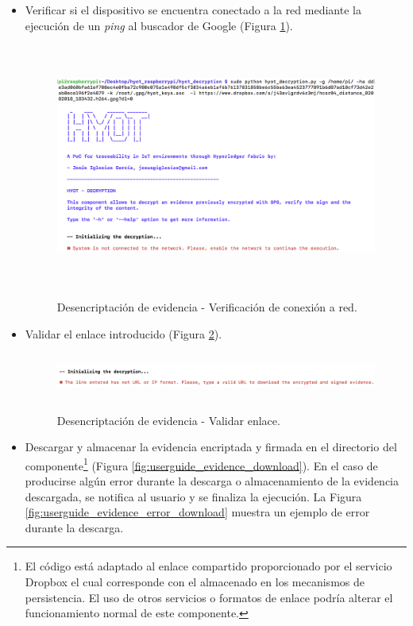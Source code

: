 \documentclass[12pt,a4paper, twoside]{report}
\begin{document}
	\begin{itemize}
		\item Verificar si el dispositivo se encuentra conectado a la red mediante la ejecución de un \textit{ping} al buscador de Google (Figura \ref{fig:userguide_evidence_ping}).
		
			\begin{figure}[!ht]   
				\caption{Desencriptación de evidencia - Verificación de conexión a red.} 
				\begin{center} 
					\includegraphics[width=14cm,height=8cm]{Images/userGuide/evidence/network} \\
					\label{fig:userguide_evidence_ping} 
				\end{center}  
			\end{figure}
		
		\newpage
		
		\item Validar el enlace introducido (Figura \ref{fig:userguide_evidence_link}).
		
			\begin{figure}[!ht]   
				\caption{Desencriptación de evidencia - Validar enlace.} 
				\begin{center} 
					\includegraphics[width=18cm,height=1.5cm]{Images/userGuide/evidence/invalidLink} \\
					\label{fig:userguide_evidence_link} 
				\end{center}  
			\end{figure}
			
		\item Descargar y almacenar la evidencia encriptada y firmada en el directorio del componente\footnote{El código está adaptado al enlace compartido proporcionado por el servicio Dropbox el cual corresponde con el almacenado en los mecanismos de persistencia. El uso de otros servicios o formatos de enlace podría alterar el funcionamiento normal de este componente.} (Figura \ref{fig:userguide_evidence_download}).	En el caso de producirse algún error durante la descarga o almacenamiento de la evidencia descargada, se notifica al usuario y se finaliza la ejecución. La Figura \ref{fig:userguide_evidence_error_download} muestra un ejemplo de error durante la descarga.
				

\end{itemize}
\end{document}
